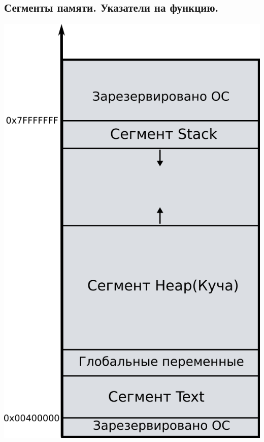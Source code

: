 \documentclass{article}
\begin{document}
\subsection*{Сегменты памяти. Указатели на функцию.}
\begin{center}
\includegraphics[scale=1.35]{../images/memory_layout.png}
\end{center}
\end{document}
